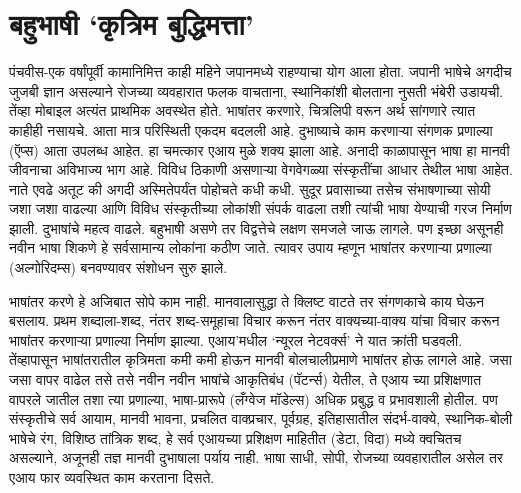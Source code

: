 \chapter{बहुभाषी `कृत्रिम बुद्धिमत्ता'}

पंचवीस-एक वर्षांपूर्वी कामानिमित्त काही महिने जपानमध्ये राहण्याचा योग आला होता. जपानी भाषेचे अगदीच जुजबी ज्ञान असल्याने रोजच्या व्यवहारात फलक वाचताना, स्थानिकांशी बोलताना नुसती भंबेरी उडायची. तेंव्हा मोबाइल अत्यंत प्राथमिक अवस्थेत होते. भाषांतर करणारे, चित्रलिपी वरून अर्थ सांगणारे त्यात काहीही नसायचे. आता मात्र परिस्थिती एकदम बदलली आहे. दुभाष्याचे काम करणाऱ्या संगणक प्रणाल्या (ऍप्स) आता उपलब्ध आहेत. हा चमत्कार एआय मुळे शक्य झाला आहे.  अनादी काळापासून भाषा हा मानवी जीवनाचा अविभाज्य भाग आहे. विविध ठिकाणी असणाऱ्या वेगवेगळ्या संस्कृतींचा आधार तेथील भाषा आहेत. नाते एवढे अतूट की अगदी अस्मितेपर्यंत पोहोचते कधी कधी. सुदूर प्रवासाच्या तसेच संभाषणाच्या सोयी जशा जशा वाढल्या आणि विविध संस्कृतीच्या लोकांशी संपर्क वाढला तशी त्यांची भाषा येण्याची गरज निर्माण झाली. दुभाषांचे महत्व वाढले. बहुभाषी असणे तर विद्वत्तेचे लक्षण समजले जाऊ लागले. पण इच्छा असूनही नवीन भाषा शिकणे हे सर्वसामान्य लोकांना कठीण जाते. त्यावर उपाय म्हणून भाषांतर करणाऱ्या प्रणाल्या (अल्गोरिदम्स) बनवण्यावर संशोधन सुरु झाले.

भाषांतर करणे हे अजिबात सोपे काम नाही. मानवालासुद्धा ते क्लिष्ट वाटते तर संगणकाचे काय घेऊन बसलाय. प्रथम शब्दाला-शब्द, नंतर शब्द-समूहाचा विचार करून नंतर वाक्यच्या-वाक्य यांचा विचार करून भाषांतर करणाऱ्या प्रणाल्या निर्माण झाल्या. एआय'मधील `न्यूरल नेटवर्क्स' ने यात क्रांती घडवली. तेंव्हापासून भाषांतरातील कृत्रिमता कमी कमी होऊन मानवी बोलचालीप्रमाणे भाषांतर होऊ लागले आहे. जसा जसा वापर वाढेल तसे तसे नवीन नवीन भाषांचे आकृतिबंध (पॅटर्न्स) येतील, ते एआय च्या प्रशिक्षणात वापरले जातील तशा त्या प्रणाल्या, भाषा-प्रारूपे (लँग्वेज मॉडेल्स) अधिक प्रबुद्ध व प्रभावशाली होतील. पण संस्कृतीचे सर्व आयाम, मानवी भावना, प्रचलित वाक्प्रचार, पूर्वग्रह, इतिहासातील संदर्भ-वाक्ये, स्थानिक-बोली भाषेचे रंग, विशिष्ठ तांत्रिक  शब्द, हे सर्व एआयच्या प्रशिक्षण माहितीत (डेटा, विदा) मध्ये क्वचितच असल्याने, अजूनही तज्ञ मानवी दुभाषाला पर्याय नाही. भाषा साधी, सोपी, रोजच्या व्यवहारातील असेल तर एआय फार व्यवस्थित काम करताना दिसते.  

